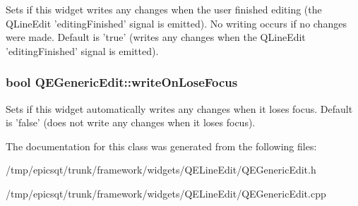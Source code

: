 \label{classQEGenericEdit_a72daabd68fba3750b5633a9ec610e5d3}
Sets if this widget writes any changes when the user finished editing (the QLineEdit 'editingFinished' signal is emitted). No writing occurs if no changes were made. Default is 'true' (writes any changes when the QLineEdit 'editingFinished' signal is emitted). \hypertarget{classQEGenericEdit_a2da40951e678a9e31413b87b45d59c64}{
\subsubsection[{writeOnLoseFocus}]{\setlength{\rightskip}{0pt plus 5cm}bool QEGenericEdit::writeOnLoseFocus}}
\label{classQEGenericEdit_a2da40951e678a9e31413b87b45d59c64}
Sets if this widget automatically writes any changes when it loses focus. Default is 'false' (does not write any changes when it loses focus). 

The documentation for this class was generated from the following files:\begin{DoxyCompactItemize}
\item 
/tmp/epicsqt/trunk/framework/widgets/QELineEdit/QEGenericEdit.h\item 
/tmp/epicsqt/trunk/framework/widgets/QELineEdit/QEGenericEdit.cpp\end{DoxyCompactItemize}
